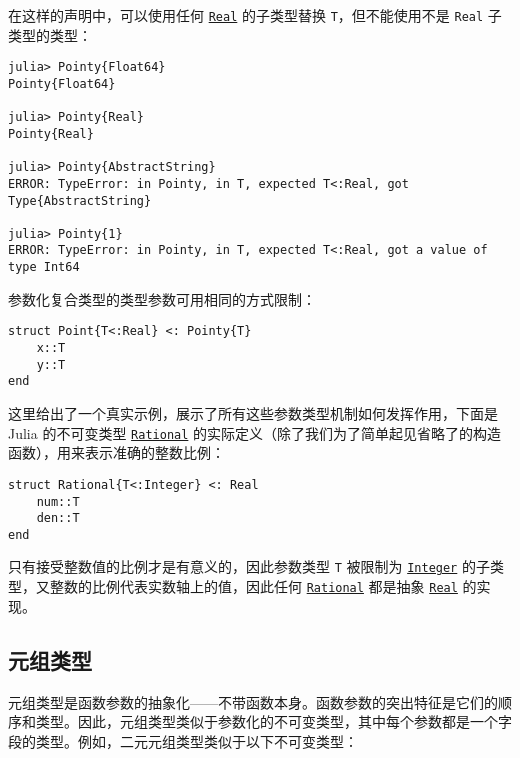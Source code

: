 在这样的声明中，可以使用任何 \hyperlink{6175959395021454412}{\texttt{Real}} 的子类型替换 \texttt{T}，但不能使用不是 \texttt{Real} 子类型的类型：




\begin{verbatim}
julia> Pointy{Float64}
Pointy{Float64}

julia> Pointy{Real}
Pointy{Real}

julia> Pointy{AbstractString}
ERROR: TypeError: in Pointy, in T, expected T<:Real, got Type{AbstractString}

julia> Pointy{1}
ERROR: TypeError: in Pointy, in T, expected T<:Real, got a value of type Int64
\end{verbatim}



参数化复合类型的类型参数可用相同的方式限制：




\begin{verbatim}
struct Point{T<:Real} <: Pointy{T}
    x::T
    y::T
end
\end{verbatim}



这里给出了一个真实示例，展示了所有这些参数类型机制如何发挥作用，下面是 Julia 的不可变类型 \hyperlink{8304566144531167610}{\texttt{Rational}} 的实际定义（除了我们为了简单起见省略了的构造函数），用来表示准确的整数比例：




\begin{verbatim}
struct Rational{T<:Integer} <: Real
    num::T
    den::T
end
\end{verbatim}



只有接受整数值的比例才是有意义的，因此参数类型 \texttt{T} 被限制为 \hyperlink{8469131683393450448}{\texttt{Integer}} 的子类型，又整数的比例代表实数轴上的值，因此任何 \hyperlink{8304566144531167610}{\texttt{Rational}} 都是抽象 \hyperlink{6175959395021454412}{\texttt{Real}} 的实现。



\hypertarget{5158816437121320312}{}


\subsection{元组类型}



元组类型是函数参数的抽象化——不带函数本身。函数参数的突出特征是它们的顺序和类型。因此，元组类型类似于参数化的不可变类型，其中每个参数都是一个字段的类型。例如，二元元组类型类似于以下不可变类型：




